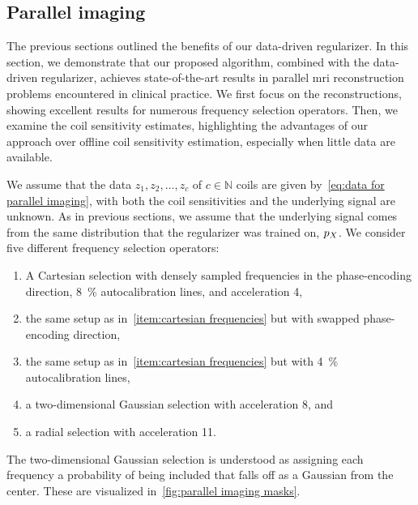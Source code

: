 \subsection{Parallel imaging}%
\label{ssec:parallel imaging}
The previous sections outlined the benefits of our data-driven regularizer.
In this section, we demonstrate that our proposed algorithm, combined with the data-driven regularizer, achieves state-of-the-art results in parallel \gls{mri} reconstruction problems encountered in clinical practice.
We first focus on the reconstructions, showing excellent results for numerous frequency selection operators.
Then, we examine the coil sensitivity estimates, highlighting the advantages of our approach over offline coil sensitivity estimation, especially when little data are available.

We assume that the data \( z_{\num{1}}, z_{\num{2}}, \dotsc, z_c \) of \( c \in \mathbb{N} \) coils are given by~\cref{eq:data for parallel imaging}, with both the coil sensitivities and the underlying signal are unknown.
As in previous sections, we assume that the underlying signal comes from the same distribution that the regularizer was trained on, \( p_X \).
We consider five different frequency selection operators:
\begin{enumerate}
	\item A Cartesian selection with densely sampled frequencies in the phase-encoding direction, \qty{8}{\percent} autocalibration lines, and acceleration \num{4},\label{item:cartesian frequencies}
	\item the same setup as in~\cref{item:cartesian frequencies} but with swapped phase-encoding direction,
	\item the same setup as in~\cref{item:cartesian frequencies} but with \qty{4}{\percent} autocalibration lines,
	\item a two-dimensional Gaussian selection with acceleration \num{8}, and
	\item a radial selection with acceleration \num{11}.
\end{enumerate}
The two-dimensional Gaussian selection is understood as assigning each frequency a probability of being included that falls off as a Gaussian from the center.
These are visualized in~\cref{fig:parallel imaging masks}.
